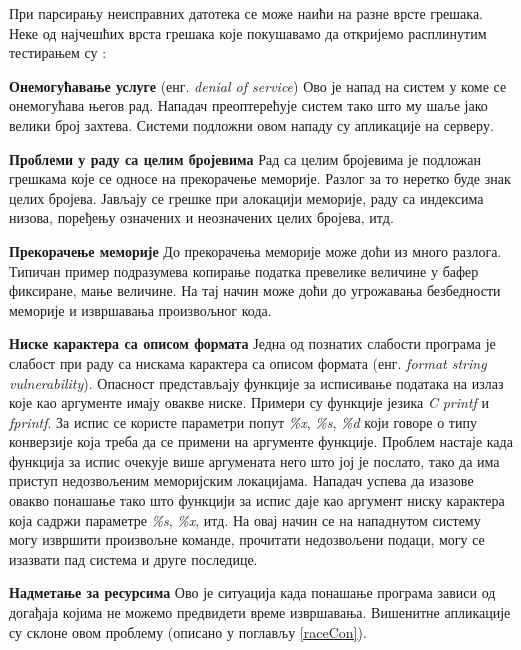 \documentclass[12pt,oneside]{memoir}
\begin{document}
При парсирању неисправних датотека се може наићи на разне врсте грешака. Неке од најчешћих врста грешака које покушавамо да откријемо расплинутим тестирањем су \cite{fuzzingBrute, fuzzing}:
\begin{description}
\item \textbf{Онемогућавање услуге} (енг. \textit{denial of service}) Ово је напад на систем у коме се онемогућава његов рад. Нападач преоптерећује систем тако што му шаље јако велики број захтева. Системи подложни овом нападу су апликације на серверу.   
\item \textbf{Проблеми у раду са целим бројевима} Рад са целим бројевима је подложан грешкама које се односе на прекорачење меморије. Разлог за то неретко буде знак целих бројева. Јављају се грешке при алокацији меморије, раду са индексима низова, поређењу означених и неозначених целих бројева, итд.
\item \textbf{Прекорачење меморије} До прекорачења меморије може доћи из много разлога. Типичан пример подразумева копирање податка превелике величине у бафер фиксиране, мање величине. На тај начин може доћи до угрожавања безбедности меморије и извршавања произвољног кода.
\item \textbf{Ниске карактера са описом формата} Једна од познатих слабости програма је слабост при раду са нискама карактера са описом формата  (енг. \textit{format string vulnerability}). Опасност представљају функције за исписивање података на излаз које као аргументе имају овакве ниске. Примери су функције језика \textit{C} \textit{printf} и \textit{fprintf}. За испис се користе параметри попут \textit{\%x}, \textit{\%s}, \textit{\%d} који говоре о типу конверзије која треба да се примени на аргументе функције. Проблем настаје када функција за испис очекује више аргумената него што јој је послато, тако да има приступ недозвољеним меморијским локацијама. Нападач успева да изазове овакво понашање тако што функцији за испис даје као аргумент ниску карактера која садржи параметре \textit{\%s}, \textit{\%x}, итд. На овај начин се на нападнутом систему могу извршити произвољне команде, прочитати недозвољени подаци, могу се изазвати пад система и друге последице. 
\item \textbf{Надметање за ресурсима} Ово је ситуација када понашање програма зависи од догађаја којима не можемо предвидети време извршавања. Вишенитне апликације су склоне овом проблему (описано у поглављу \ref{raceCon}).
\end{description}
\end{document}
